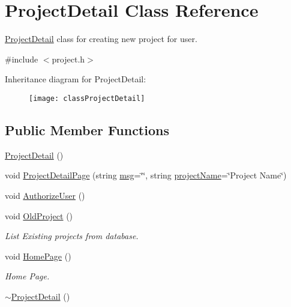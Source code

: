 \hypertarget{classProjectDetail}{\section{\-Project\-Detail \-Class \-Reference}
\label{classProjectDetail}
}


\hyperlink{classProjectDetail}{\-Project\-Detail} class for creating new project for user.  




{\ttfamily \#include $<$project.\-h$>$}

\-Inheritance diagram for \-Project\-Detail\-:\begin{figure}[H]
\begin{center}
\leavevmode
\texttt{[image: classProjectDetail]}
\end{center}
\end{figure}
\subsection*{\-Public \-Member \-Functions}
\begin{DoxyCompactItemize}
\item 
\hyperlink{classProjectDetail_a405e8bbc157e30c4ff93871988218d9f}{\-Project\-Detail} ()
\item 
void \hyperlink{classProjectDetail_a581ccdab5dcd21663b78ebedbbf0d240}{\-Project\-Detail\-Page} (string \hyperlink{classInputDetail_a1abb16cd695678c3fa05e3c812823fee}{msg}=\char`\"{}\char`\"{}, string \hyperlink{classInputDetail_aaaf51475a2a4ddbe34e38c96bdb45bad}{project\-Name}=\char`\"{}\-Project \-Name\char`\"{})
\item 
void \hyperlink{classProjectDetail_ab78c9e2a0cd5079c427638a5a3971c28}{\-Authorize\-User} ()
\item 
void \hyperlink{classProjectDetail_ab92c992a37524a5f90fdcaf4868ac218}{\-Old\-Project} ()
\begin{DoxyCompactList}\small\item\em \-List \-Existing projects from database. \end{DoxyCompactList}\item 
void \hyperlink{classProjectDetail_aa36fe7134da17688018870ae8ebf2191}{\-Home\-Page} ()
\begin{DoxyCompactList}\small\item\em \-Home \-Page. \end{DoxyCompactList}\item 
\hyperlink{classProjectDetail_ab4719d14d9efb8811916f5d691099c8f}{$\sim$\-Project\-Detail} ()
\end{DoxyCompactItemize}


